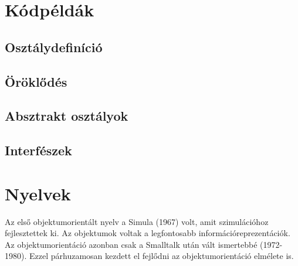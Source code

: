 \documentclass[a4paper,12pt,twoside]{report}
\theoremstyle{definition}
\begin{document}
	\chapter{Kódpéldák}\label{fejezet-peldak}
	
	\section{Osztálydefiníció}
	
	
	
	
	
	\section{Öröklődés}
	
	
	
	\section{Absztrakt osztályok}
	
	
	
	
	
	\section{Interfészek}
	
	
	
	
	
	\chapter{Nyelvek}\label{fejezet-nyelvek}
	
	Az első objektumorientált nyelv a Simula (1967) volt, amit szimulációhoz fejlesztettek ki. Az objektumok voltak a legfontosabb információreprezentációk. Az objektumorientáció azonban csak a Smalltalk után vált ismertebbé (1972-1980). Ezzel párhuzamosan kezdett el fejlődni az objektumorientáció elmélete is.
	
\end{document}
